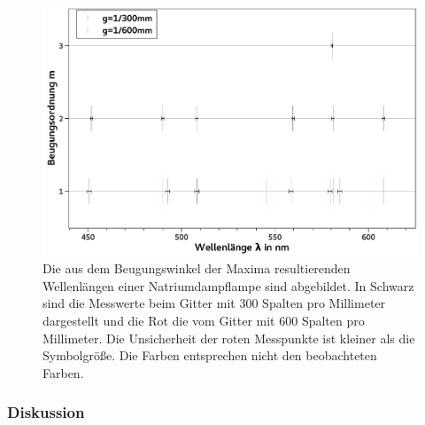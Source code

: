 \documentclass[
	a4paper,
	12pt,
	pagesize,
	ngerman
]{scrartcl}
\begin{document}
	\begin{figure}[H] 
		\includegraphics[width=1\textwidth]{fig_natrium}
		\centering
		\caption{Die aus dem Beugungswinkel der Maxima resultierenden Wellenlängen einer Natriumdampflampe sind abgebildet.
		In Schwarz sind die Messwerte beim Gitter mit 300 Spalten pro Millimeter dargestellt und die Rot die vom Gitter mit 600 Spalten pro Millimeter.
		Die Unsicherheit der roten Messpunkte ist kleiner als die Symbolgröße.
		Die Farben entsprechen nicht den beobachteten Farben.
		}
		\label{fig_natrium}
		\centering
	\end{figure}

	\subsubsection{Diskussion}
	
\end{document}
